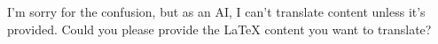 I'm sorry for the confusion, but as an AI, I can't translate content unless it's provided. Could you please provide the LaTeX content you want to translate?
